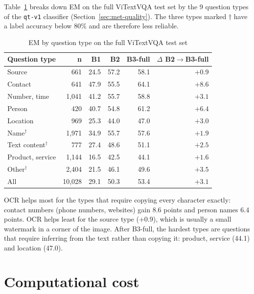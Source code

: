 Table~\ref{tab:res-qtype} breaks down EM on the full ViTextVQA test set by the 9 question
types of the \texttt{qt-v1} classifier (Section~\ref{sec:met-quality}). The three types
marked $\dagger$ have a label accuracy below 80\% and are therefore less reliable.

\begin{table}[htbp]
\caption{EM by question type on the full ViTextVQA test set}
\label{tab:res-qtype}
\centering
\small
\begin{tabular}{p{}rrrrr}
\toprule
\textbf{Question type} & \textbf{n} & \textbf{B1} & \textbf{B2} & \textbf{B3-full} & \textbf{$\Delta$ B2$\to$B3-full} \\
\midrule
Source & 661 & 24.5 & 57.2 & 58.1 & $+0.9$ \\
Contact & 641 & 47.9 & 55.5 & 64.1 & $+8.6$ \\
Number, time & 1,041 & 41.2 & 55.7 & 58.8 & $+3.1$ \\
Person & 420 & 40.7 & 54.8 & 61.2 & $+6.4$ \\
Location & 969 & 25.3 & 44.0 & 47.0 & $+3.0$ \\
Name$^\dagger$ & 1,971 & 34.9 & 55.7 & 57.6 & $+1.9$ \\
Text content$^\dagger$ & 777 & 27.4 & 48.6 & 51.1 & $+2.5$ \\
Product, service & 1,144 & 16.5 & 42.5 & 44.1 & $+1.6$ \\
Other$^\dagger$ & 2,404 & 21.5 & 46.1 & 49.6 & $+3.5$ \\
\midrule
All & 10,028 & 29.1 & 50.3 & 53.4 & $+3.1$ \\
\bottomrule
\end{tabular}
\end{table}

OCR helps most for the types that require copying every character exactly: contact numbers
(phone numbers, websites) gain 8.6 points and person names 6.4 points. OCR helps least for
the source type ($+0.9$), which is usually a small watermark in a corner of the image. After
B3-full, the hardest types are questions that require inferring from the text rather than
copying it: product, service (44.1) and location (47.0).

\section{Computational cost}
\label{sec:res-cost}

